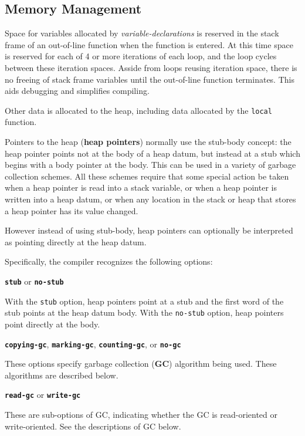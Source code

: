 \documentclass[12pt]{article}
\newcommand{\key}[1]{{\rm \bfseries #1}}
\newcommand{\ttkey}[1]{{\tt \bfseries #1}}
\newcommand{\skey}[2]{{\rm \bfseries #1#2}}
\newenvironment{indpar}[1][0.3in]%
	{\begin{list}{}%
		     {\setlength{\itemsep}{0in}%
		      \setlength{\topsep}{0in}%
		      \setlength{\parsep}{1ex}%
		      \setlength{\labelwidth}{#1}%
		      \setlength{\leftmargin}{#1}%
		      \addtolength{\leftmargin}{\labelsep}}%
	 \item}%
	{\end{list}}
\begin{document}
\subsection{Memory Management}
\label{MEMORY-MANAGEMENT}

Space for variables allocated by {\em variable-declarations}
is reserved in the stack frame of an out-of-line function when the
function is entered.  At this
time space is reserved for each of 4 or more iterations of
each loop, and the loop cycles between these iteration spaces.
Asside from loops reusing iteration space, there is no
freeing of stack frame variables until the out-of-line function
terminates.  This aids debugging and simplifies compiling.

Other data is allocated to the heap, including data allocated
by the {\tt local} function.

Pointers to the heap (\skey{heap pointer}s) normally use the stub-body concept:
the heap pointer points not at the body of a heap datum, but instead at a
stub which begins with a body pointer at the body.  This can be
used in a variety of garbage collection schemes.  All these
schemes require that some special action be taken when a heap
pointer is read into a stack variable, or when
a heap pointer is written into a heap datum, or when any location
in the stack or heap that stores a heap pointer has its value
changed.

However instead of using stub-body, heap pointers can optionally be
interpreted as pointing directly at the heap datum.

Specifically, the compiler recognizes the following options:

\begin{indpar}

\ttkey{stub} or \ttkey{no-stub}
\begin{indpar}
With the {\tt stub} option, heap pointers point at a stub and the
first word of the stub points at the heap datum body.  With the
{\tt no-stub} option, heap pointers point directly at the body.
\end{indpar}

\ttkey{copying-gc}, \ttkey{marking-gc}, \ttkey{counting-gc}, or \ttkey{no-gc}
\begin{indpar}
These options specify garbage collection (\key{GC})
algorithm being used.  These algorithms are described below.
\end{indpar}

\ttkey{read-gc} or \ttkey{write-gc}
\begin{indpar}
These are sub-options of GC, indicating whether the GC is
read-oriented or write-oriented.  See the descriptions
of GC below.
\end{indpar}

\end{indpar}
\end{document}
